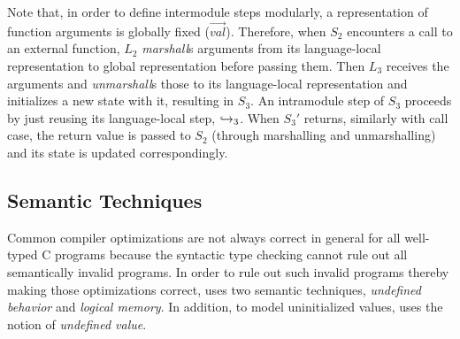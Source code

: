 {

Note that, in order to define intermodule steps modularly, a representation of function arguments is globally fixed ($\overrightarrow{val}$).
Therefore, when $S_2$ encounters a call to an external function, $L_2$ \emph{marshall}s arguments from its language-local representation to global representation before passing them.
Then $L_3$ receives the arguments and \emph{unmarshall}s those to its language-local representation and initializes a new state with it, resulting in $S_3$.
An intramodule step of $S_3$ proceeds by just reusing its language-local step, $\stackrel{}{\hookrightarrow}_3$.
When $S_3'$ returns, similarly with call case, the return value is passed to $S_2$ (through marshalling and unmarshalling) and its state is updated correspondingly.





\subsection{Semantic Techniques}\label{sec:background:ub}

Common compiler optimizations are not always correct in general for
all well-typed C programs because the syntactic type checking cannot
rule out all semantically invalid programs. In order to rule out such
invalid programs thereby making those optimizations correct, \cc{}
uses two semantic techniques, \emph{undefined behavior} and
\emph{logical memory}. In addition, to model uninitialized values,
\cc{} uses the notion of \emph{undefined value}.

}
